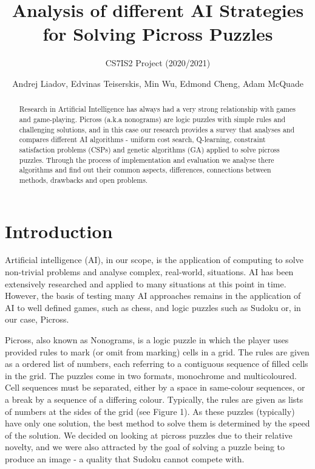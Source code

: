 \documentclass{svproc}
\begin{document}
\mainmatter
\title{Analysis of different AI Strategies for Solving Picross Puzzles}
\subtitle{CS7IS2 Project (2020/2021)}
\author{Andrej Liadov, Edvinas Teiserskis, Min Wu, Edmond Cheng, Adam McQuade}

\maketitle              %



\begin{abstract}
Research in Artificial Intelligence has always had a very strong relationship with games and game-playing. Picross (a.k.a nonograms) are logic puzzles with simple rules and challenging solutions, and in this case our research provides a survey that analyses and compares different AI algorithms - uniform cost search, Q-learning, constraint satisfaction problems (CSPs) and genetic algorithms (GA) applied to solve picross puzzles. Through the process of implementation and evaluation we analyse there algorithms and find out their common aspects, differences, connections between methods, drawbacks and open problems.
\end{abstract}


\section{Introduction}
Artificial intelligence (AI), in our scope, is the application of computing to solve non-trivial problems and analyse complex, real-world, situations.
AI has been extensively researched and applied to many situations at this point in time. However, the basis of testing many AI approaches remains in the application of AI to well defined games, such as chess, and logic puzzles such as Sudoku or, in our case, Picross.

Picross, also known as Nonograms, is a logic puzzle in which the player uses provided rules to mark (or omit from marking) cells in a grid.
The rules are given as a ordered list of numbers, each referring to a contiguous sequence of filled cells in the grid.
The puzzles come in two formats, monochrome and multicoloured.
Cell sequences must be separated, either by a space in same-colour sequences, or a break by a sequence of a differing colour.
Typically, the rules are given as lists of numbers at the sides of the grid (see Figure 1). As these puzzles (typically) have only one solution, the best method to solve them is determined by the speed of the solution.
We decided on looking at picross puzzles due to their relative novelty, and we were also attracted by the goal of solving a puzzle being to produce an image - a quality that Sudoku cannot compete with.
\end{document}
